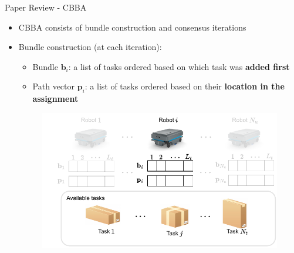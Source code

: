 \begin{frame}{Paper Review - CBBA}
    \begin{itemize}
        \item CBBA consists of bundle construction and consensus iterations
        \item Bundle construction (at each iteration):
        \begin{itemize}
            \item Bundle $\mathbf{b}_i$: a list of tasks ordered based on which task was \textbf{added first}
            \item Path vector $\mathbf{p}_i$: a list of tasks ordered based on their \textbf{location in the assignment}
        \end{itemize}
          \begin{figure}
            \centering
            {
            \includegraphics[width=0.9\linewidth]{Figures/bundle_construction_2.pdf}}
        \end{figure}
    \end{itemize}
\end{frame}

